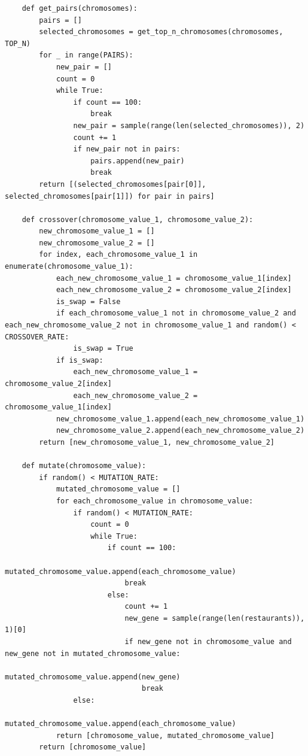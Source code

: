 \documentclass[12pt,oneside,openright,a4paper]{cpe-english-project}
\begin{document}
\begin{lstlisting}
    def get_pairs(chromosomes):
        pairs = []
        selected_chromosomes = get_top_n_chromosomes(chromosomes, TOP_N)
        for _ in range(PAIRS):
            new_pair = []
            count = 0
            while True:
                if count == 100:
                    break
                new_pair = sample(range(len(selected_chromosomes)), 2)
                count += 1
                if new_pair not in pairs:
                    pairs.append(new_pair)
                    break
        return [(selected_chromosomes[pair[0]], selected_chromosomes[pair[1]]) for pair in pairs]

    def crossover(chromosome_value_1, chromosome_value_2):
        new_chromosome_value_1 = []
        new_chromosome_value_2 = []
        for index, each_chromosome_value_1 in enumerate(chromosome_value_1):
            each_new_chromosome_value_1 = chromosome_value_1[index]
            each_new_chromosome_value_2 = chromosome_value_2[index]
            is_swap = False
            if each_chromosome_value_1 not in chromosome_value_2 and each_new_chromosome_value_2 not in chromosome_value_1 and random() < CROSSOVER_RATE:
                is_swap = True
            if is_swap:
                each_new_chromosome_value_1 = chromosome_value_2[index]
                each_new_chromosome_value_2 = chromosome_value_1[index]
            new_chromosome_value_1.append(each_new_chromosome_value_1)
            new_chromosome_value_2.append(each_new_chromosome_value_2)
        return [new_chromosome_value_1, new_chromosome_value_2]

    def mutate(chromosome_value):
        if random() < MUTATION_RATE:
            mutated_chromosome_value = []
            for each_chromosome_value in chromosome_value:
                if random() < MUTATION_RATE:
                    count = 0
                    while True:
                        if count == 100:
                            mutated_chromosome_value.append(each_chromosome_value)
                            break
                        else:
                            count += 1
                            new_gene = sample(range(len(restaurants)), 1)[0]
                            if new_gene not in chromosome_value and new_gene not in mutated_chromosome_value:
                                mutated_chromosome_value.append(new_gene)
                                break
                else:
                    mutated_chromosome_value.append(each_chromosome_value)
            return [chromosome_value, mutated_chromosome_value]
        return [chromosome_value]


\end{lstlisting}
\end{document}
